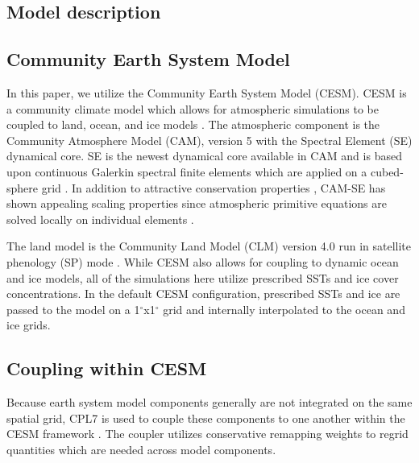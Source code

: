 \documentclass[draft,ms]{AGUTeX}
\newcommand{\degree}{$^{\circ}$}
\begin{document}
\begin{article}

\section{Model description}
\label{sec:model}

\subsection{Community Earth System Model}
\label{subsec:cam}

In this paper, we utilize the Community Earth System Model (CESM). CESM is a community climate model which allows for atmospheric simulations to be coupled to land, ocean, and ice models \citep{Hurrell2013CESM}. The atmospheric component is the Community Atmosphere Model (CAM), version 5 \citep{CAM5Tech} with the Spectral Element (SE) dynamical core. SE is the newest dynamical core available in CAM and is based upon continuous Galerkin spectral finite elements which are applied on a cubed-sphere grid \citep{Taylor1997,Thomas2005,Taylor2010}. In addition to attractive conservation properties \citep{Taylor2011}, CAM-SE has shown appealing scaling properties since atmospheric primitive equations are solved locally on individual elements \citep{Dennis2012,Evans2013}.

The land model is the Community Land Model (CLM) version 4.0 run in satellite phenology (SP) mode \citep{CLM40Tech}. While CESM also allows for coupling to dynamic ocean and ice models, all of the simulations here utilize prescribed SSTs and ice cover concentrations. In the default CESM configuration, prescribed SSTs and ice are passed to the model on a 1\degree{}x1\degree{} grid and internally interpolated to the ocean and ice grids.

\subsection{Coupling within CESM}
\label{subsec:coupling}

Because earth system model components generally are not integrated on the same spatial grid, CPL7 is used to couple these components to one another within the CESM framework \citep{Craig2012}. The coupler utilizes conservative remapping weights to regrid quantities which are needed across model components.


\end{article}
\end{document}
